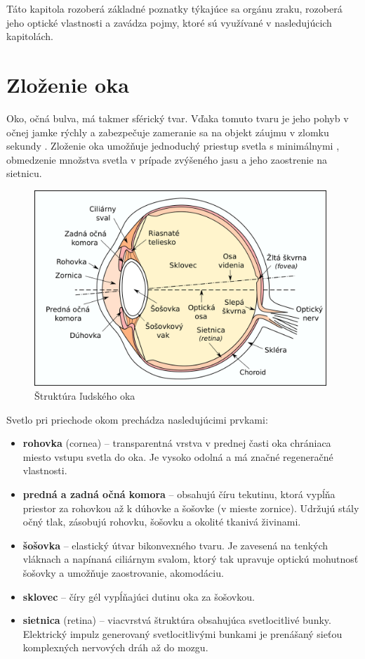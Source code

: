 Táto kapitola rozoberá základné poznatky týkajúce sa orgánu zraku, rozoberá jeho optické vlastnosti a zavádza pojmy, ktoré sú využívané v nasledujúcich kapitolách.

\section{Zloženie oka}\label{sec:oko}
Oko, očná bulva, má takmer sférický tvar. Vďaka tomuto tvaru je jeho pohyb v očnej jamke rýchly a zabezpečuje zameranie sa na objekt záujmu v zlomku sekundy \cite{bio4}.
Zloženie oka umožňuje jednoduchý priestup svetla s minimálnymi , obmedzenie množstva svetla v prípade zvýšeného jasu a jeho zaostrenie na sietnicu.

\begin{figure}[h]
  \centering
  \includegraphics[width=11cm]{img/Eyesection.png}
  \caption{Štruktúra ľudského oka\cite{retina}}
  \label{fig:retina}
\end{figure}

Svetlo pri priechode okom prechádza nasledujúcimi prvkami\cite{zloz_oka}:
\begin{itemize}
\item \textbf{rohovka} (cornea) -- transparentná vrstva v prednej časti oka chrániaca miesto vstupu svetla do oka. Je vysoko odolná a má značné regeneračné vlastnosti.
\item \textbf{predná a zadná očná komora} -- obsahujú číru tekutinu, ktorá vypĺňa priestor za rohovkou až k dúhovke a šošovke (v mieste zornice). Udržujú stály očný tlak, zásobujú rohovku, šošovku a okolité tkanivá živinami\cite{zmysly}.
\item \textbf{šošovka} -- elastický útvar bikonvexného tvaru. Je zavesená na tenkých vláknach a napínaná ciliárnym svalom, ktorý tak upravuje optickú mohutnosť šošovky a umožňuje zaostrovanie, akomodáciu.
\item \textbf{sklovec} -- číry gél vypĺňajúci dutinu oka za šošovkou.
\item \textbf{sietnica} (retina) -- viacvrstvá štruktúra obsahujúca svetlocitlivé bunky. Elektrický impulz generovaný svetlocitlivými bunkami je prenášaný sieťou komplexných nervových dráh až do mozgu.
\end{itemize}


